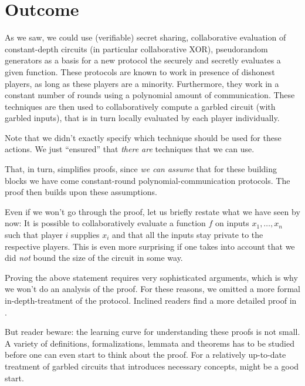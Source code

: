 \section{Outcome}
\label{sec:correctness-and-security}

As we saw, we could use (verifiable) secret sharing, collaborative evaluation of constant-depth circuits (in particular collaborative XOR), pseudorandom generators as a basis for a new protocol the securely and secretly evaluates a given function. These protocols are known to work in presence of dishonest players, as long as these players are a minority. Furthermore, they work in a constant number of rounds using a polynomial amount of communication. These techniques are then used to collaboratively compute a garbled circuit (with garbled inputs), that is in turn locally evaluated by each player individually.

Note that we didn't exactly specify which technique should be used for these actions. We just ``ensured'' that \emph{there are} techniques that we can use.

That, in turn, simplifies proofs, since \emph{we can assume} that for these building blocks we have come constant-round polynomial-communication protocols. The proof then builds upon these assumptions.

Even if we won't go through the proof, let us briefly restate what we have seen by now: It is possible to collaboratively evaluate a function $f$ on inputs $x_1,\dots,x_n$ such that player $i$ supplies $x_i$ and that all the inputs stay private to the respective players. This is even more surprising if one takes into account that we did \emph{not} bound the size of the circuit in some way.

Proving the above statement requires very sophisticated arguments, which is why we won't do an analysis of the proof. For these reasons, we omitted a more formal in-depth-treatment of the protocol. Inclined readers find a more detailed proof in \cite{Rogaway:1991:RCS:888502}.

But reader beware: the learning curve for understanding these proofs is not small. A variety of definitions, formalizations, lemmata and theorems has to be studied before one can even start to think about the proof. For a relatively up-to-date treatment of garbled circuits that introduces necessary concepts, \cite{bellare-hoang-rogaway-garbling-schemes} might be a good start.

